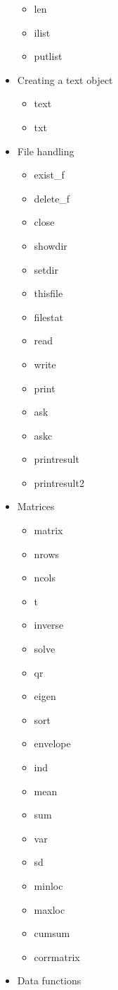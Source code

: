 \begin{itemize}
\begin{itemize}
\item len
\item ilist
\item putlist
\end{itemize}
\item  Creating a text  object
\begin{itemize}
\item text
\item txt
\end{itemize}
\item File handling
\begin{itemize}
\item exist\_f
\item delete\_f
\item close
\item showdir
\item setdir
\item thisfile
\item filestat
\item read
\item write
\item print
\item ask
\item askc
\item printresult
\item printresult2
\end{itemize}
\item  Matrices
\begin{itemize}
\item matrix
\item nrows
\item ncols
\item t
\item inverse
\item solve
\item qr
\item eigen
\item sort
\item envelope
\item ind
\item mean
\item sum
\item var
\item sd
\item minloc
\item maxloc
\item cumsum
\item corrmatrix
\end{itemize}
\item  Data functions

\end{itemize}
